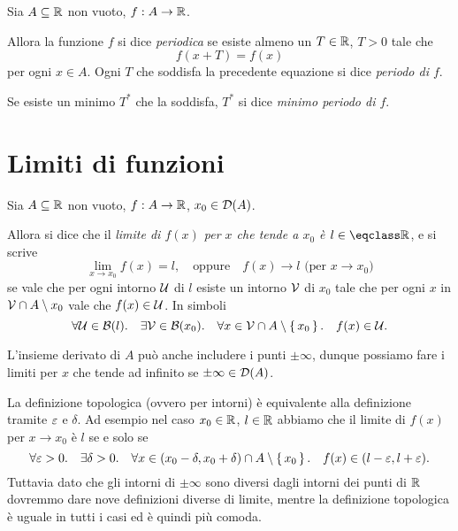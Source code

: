 \begin{definition}
    [Periodicità]
    Sia $A \subseteq \mathbb{R}$ non vuoto, $f : A \to \mathbb{R}$.

    Allora la funzione $f$ si dice \emph{periodica} se esiste almeno un $T \in \mathbb{R}$, $T > 0$ tale che \[
        f(x + T) = f(x)
    \] per ogni $x \in A$. Ogni $T$ che soddisfa la precedente equazione si dice \emph{periodo di $f$}. 
    
    Se esiste un minimo $T^*$ che la soddisfa, $T^*$ si dice \emph{minimo periodo di $f$}.
\end{definition}

\section{Limiti di funzioni}

\begin{definition}
    Sia $A \subseteq \mathbb{R}$ non vuoto, $f : A \to \mathbb{R}$, $x_0 \in \mathcal{D}\!\left(A\right)$.

    Allora si dice che il \emph{limite di $f(x)$ per $x$ che tende a $x_0$ è $l \in \closure{\R}$}, e si scrive \[
        \lim_{x \to x_0} f(x) = l, \quad \text{oppure} \quad f(x) \to l \text{   (per $x \to x_0$)}     
    \] se vale che per ogni intorno $\mathcal{U}$ di $l$ esiste un intorno $\mathcal{V}$ di $x_0$ tale che per ogni $x$ in $\mathcal{V} \cap A \setminus x_0$ vale che $f(x) \in \mathcal{U}$. 
    In simboli \[
        \forall \mathcal{U} \in \mathcal{B}(l). \quad \exists \mathcal{V} \in \mathcal{B}(x_0). \quad \forall x \in \mathcal{V} \cap A \setminus \left\{\,x_0\,\right\}. \quad f(x) \in \mathcal{U}.    
    \]
\end{definition}

\begin{remark}
    L'insieme derivato di $A$ può anche includere i punti $\pm\infty$, dunque possiamo fare i limiti per $x$ che tende ad infinito se $\pm\infty \in \mathcal{D}\!\left(A\right)$.
\end{remark}

La definizione topologica (ovvero per intorni) è equivalente alla definizione tramite $\varepsilon$ e $\delta$. Ad esempio nel caso $x_0 \in \mathbb{R}$, $l \in \mathbb{R}$ abbiamo che il limite di $f(x)$ per $x \to x_0$ è $l$ se e solo se \[
    \forall \varepsilon > 0. \quad \exists \delta > 0. \quad \forall x \in (x_0 - \delta, x_0 + \delta) \cap A \setminus \left\{\,x_0\,\right\}. \quad f(x) \in (l - \varepsilon, l + \varepsilon).
\] Tuttavia dato che gli intorni di $\pm\infty$ sono diversi dagli intorni dei punti di $\mathbb{R}$ dovremmo dare nove definizioni diverse di limite, mentre la definizione topologica è uguale in tutti i casi ed è quindi più comoda.